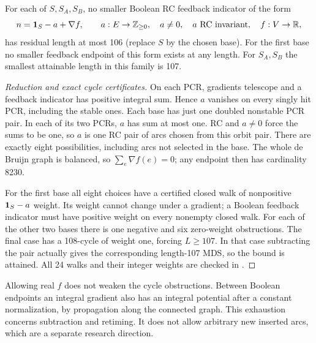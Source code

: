 \begin{proposition}
\label{prop:affine-pruning}
For each of $S,S_A,S_B$, no smaller Boolean RC feedback indicator
of the form
\[
 n=\mathbf 1_S-a+\nabla f,\qquad
 a:E\to\mathbb Z_{\ge0},\quad a\ne0,\quad a\text{ RC invariant},
 \quad f:V\to\mathbb R,
\]
has residual length at most 106 (replace $S$ by the chosen base).
For the first base no smaller feedback endpoint of this form
exists at any length. For $S_A,S_B$ the smallest attainable
length in this family is 107.
\end{proposition}
\begin{proof}[Reduction and exact cycle certificates]
On each PCR, gradients telescope and a feedback indicator has
positive integral sum. Hence $a$ vanishes on every singly hit
PCR, including the stable ones. Each base has just one doubled
nonstable PCR pair. In each of its two PCRs, $a$ has sum at most
one. RC and $a\ne0$ force the sums to be one, so $a$ is one
RC pair of arcs chosen from this orbit pair. There are exactly
eight possibilities, including arcs not selected in the base.
The whole de Bruijn graph is balanced, so $\sum_e\nabla f(e)=0$;
any endpoint then has cardinality 8230.

For the first base all eight choices have a certified closed
walk of nonpositive $\mathbf 1_S-a$ weight. Its weight cannot change
under a gradient; a Boolean feedback indicator must have positive
weight on every nonempty closed walk. For each of the other two
bases there is one negative and six zero-weight obstructions.
The final case has a 108-cycle of weight one, forcing $L\ge107$.
In that case subtracting the pair actually gives the corresponding
length-107 MDS, so the bound is attained. All 24 walks and their
integer weights are checked in
.
\end{proof}
Allowing real $f$ does not weaken the cycle obstructions. Between
Boolean endpoints an integral gradient also has an integral
potential after a constant normalization, by propagation along
the connected graph. This exhaustion concerns subtraction and
retiming. It does not allow arbitrary new inserted arcs, which
are a separate research direction.
